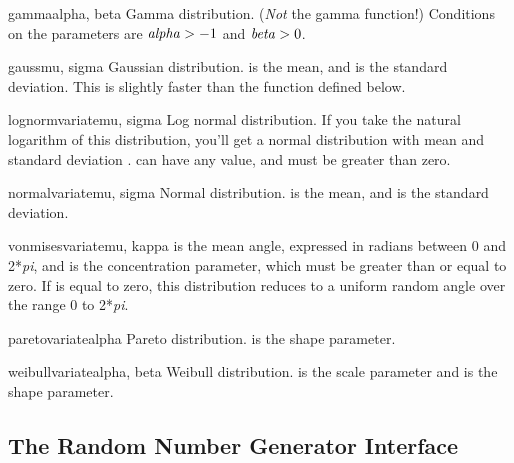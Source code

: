 \begin{funcdesc}{gamma}{alpha, beta}
Gamma distribution.  (\emph{Not} the gamma function!)  Conditions on
the parameters are $\mbox{\normalsize\textrm{\textit{alpha\/}}} > -1$ and $\mbox{\normalsize\textrm{\textit{beta\/}}} > 0$.
\end{funcdesc}

\begin{funcdesc}{gauss}{mu, sigma}
Gaussian distribution.   is the mean, and  is the
standard deviation.  This is slightly faster than the
 function defined below.
\end{funcdesc}

\begin{funcdesc}{lognormvariate}{mu, sigma}
Log normal distribution.  If you take the natural logarithm of this
distribution, you'll get a normal distribution with mean  and
standard deviation .   can have any value, and
 must be greater than zero.  
\end{funcdesc}

\begin{funcdesc}{normalvariate}{mu, sigma}
Normal distribution.   is the mean, and  is the
standard deviation.
\end{funcdesc}

\begin{funcdesc}{vonmisesvariate}{mu, kappa}
 is the mean angle, expressed in radians between 0 and 2*\emph{pi},
and  is the concentration parameter, which must be greater
than or equal to zero.  If  is equal to zero, this
distribution reduces to a uniform random angle over the range 0 to
2*\emph{pi}.
\end{funcdesc}

\begin{funcdesc}{paretovariate}{alpha}
Pareto distribution.   is the shape parameter.
\end{funcdesc}

\begin{funcdesc}{weibullvariate}{alpha, beta}
Weibull distribution.   is the scale parameter and
 is the shape parameter.
\end{funcdesc}

\begin{seealso}
\end{seealso}


\subsection{The Random Number Generator Interface
            \label{rng-objects}}


